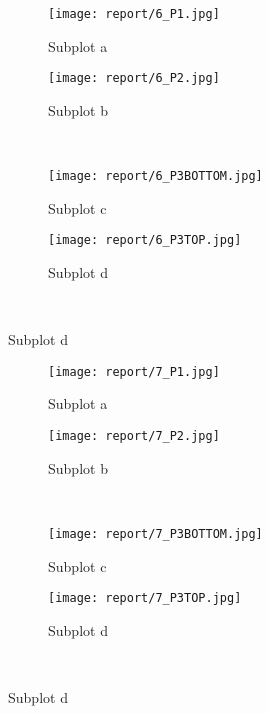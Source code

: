\documentclass{article}%
\begin{document}
\begin{figure}[h!]%
\caption{7HAFTERSTARTFIRE}%
\centering%
\begin{subfigure}{0.45\textwidth}%
\texttt{[image:  report/6\_P1.jpg]}%
\caption{Subplot a}%
\end{subfigure}%
\begin{subfigure}{0.45\textwidth}%
\texttt{[image:  report/6\_P2.jpg]}%
\caption{Subplot b}%
\end{subfigure}%
\\%
\begin{subfigure}{0.45\textwidth}%
\texttt{[image:  report/6\_P3BOTTOM.jpg]}%
\caption{Subplot c}%
\end{subfigure}%
\begin{subfigure}{0.45\textwidth}%
\texttt{[image:  report/6\_P3TOP.jpg]}%
\caption{Subplot d}%
\end{subfigure}%
\\%
\end{figure}

%


\begin{figure}[h!]%
\caption{8HAFTERSTARTFIRE}%
\centering%
\begin{subfigure}{0.45\textwidth}%
\texttt{[image:  report/7\_P1.jpg]}%
\caption{Subplot a}%
\end{subfigure}%
\begin{subfigure}{0.45\textwidth}%
\texttt{[image:  report/7\_P2.jpg]}%
\caption{Subplot b}%
\end{subfigure}%
\\%
\begin{subfigure}{0.45\textwidth}%
\texttt{[image:  report/7\_P3BOTTOM.jpg]}%
\caption{Subplot c}%
\end{subfigure}%
\begin{subfigure}{0.45\textwidth}%
\texttt{[image:  report/7\_P3TOP.jpg]}%
\caption{Subplot d}%
\end{subfigure}%
\\%
\end{figure}

%
\end{document}
